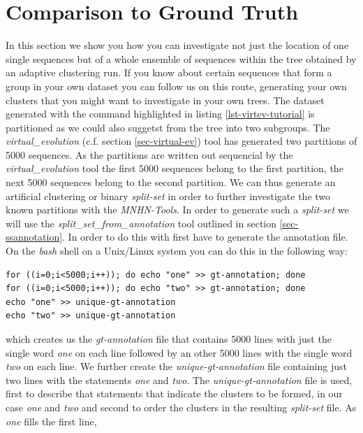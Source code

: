 \section{Comparison to Ground Truth}

In this section we show you how you can investigate not just the location
of one single sequences but of a whole ensemble of sequences within the tree
obtained by an adaptive clustering run. If you know about certain
sequences that form a group in your own dataset you can follow us on
this route, generating your own clusters that you might want to
investigate in your own trees. The dataset generated with the command
highlighted in listing \ref{lst-virtev-tutorial} is partitioned as we
could also suggetst from the tree into two subgroups. The
\emph{virtual\_evolution} (c.f. section \ref{sec-virtual-ev}) tool has
generated two partitions of 5000 sequences. As the partitions are
written out sequencial by the \emph{virtual\_evolution} tool the
first 5000 sequences belong to the first partition, the next 5000
sequences belong to the second partition. We can thus generate an
artificial clustering or binary \emph{split-set} in order to further
investigate the two known partitions with the \emph{MNHN-Tools}. In
order to generate such a \emph{split-set} we will use the
\emph{split\_set\_from\_annotation} tool outlined in section
\ref{sec-ssannotation}. In order to do this with first have to
generate the annotation file. On the \emph{bash} \cite{bash} shell on
a Unix/Linux system you can do this in the following way:
\begin{lstlisting}
for ((i=0;i<5000;i++)); do echo "one" >> gt-annotation; done
for ((i=0;i<5000;i++)); do echo "two" >> gt-annotation; done
echo "one" >> unique-gt-annotation
echo "two" >> unique-gt-annotation
\end{lstlisting}
which creates us the \emph{gt-annotation} file that contains 5000
lines with just the single word \emph{one} on each line followed by an
other 5000 lines with the single word \emph{two} on each line. We
further create the \emph{unique-gt-annotation} file containing just
two lines with the statements \emph{one} and \emph{two}. The
\emph{unique-gt-annotation} file is used, first to describe that
statements that indicate the clusters to be formed, in our case
\emph{one} and \emph{two} and second to order the clusters in the
resulting \emph{split-set} file. As \emph{one} fills the first line,

